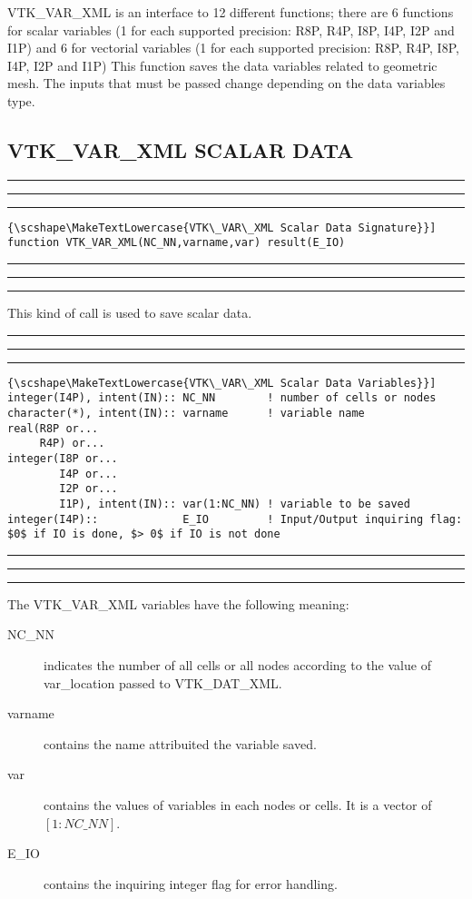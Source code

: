 \documentclass[pagesize=pdftex,fontsize=10pt,paper=a4,oneside]{scrbook}
\DeclareRobustCommand{\MarginNote}[1]{\marginpar{%
\slshape\footnotesize%
\parindent=0pt\lineskip=0pt\lineskiplimit=0pt%
\tolerance=2000\hyphenpenalty=300\exhyphenpenalty=300%
\doublehyphendemerits=100000\finalhyphendemerits=\doublehyphendemerits%
\raggedright\hspace{0pt}#1}}
\newenvironment{boxred}[1]%
               {%
                \noindent\hspace*{-0.025\textwidth}%
                \color{Maroon}%
                \rule[-5.8pt]{0.6pt}{6pt}\hspace*{-0.6pt}\rule{1.05\textwidth}{0.6pt}\hspace*{-0.6pt}\rule[-5.8pt]{0.6pt}{6pt}%
                \color{black}%
                \vspace*{0.6pt}\MarginNote{\color{Maroon}{#1}}%
               }%
               {%
                \noindent\hspace*{-0.025\textwidth}%
                \color{Maroon}%
                \rule[0pt]{0.6pt}{6pt}\hspace*{-0.6pt}\rule{1.05\textwidth}{0.6pt}\hspace*{-0.6pt}\rule[0pt]{0.6pt}{6pt}%
                \color{black}%
                \vspace*{2mm}%
               }
\DeclareRobustCommand{\MaiuscolettoBS}[1]{\textls[80]{\scshape\MakeTextLowercase{#1}}}
\begin{document}
VTK\_VAR\_XML is an interface to 12 different functions; there are 6 functions for scalar variables (1 for each supported
precision: R8P, R4P, I8P, I4P, I2P and I1P) and 6 for vectorial variables (1 for each supported precision: R8P, R4P, I8P,
I4P, I2P and I1P)
This function saves the data variables related to geometric mesh. The inputs that must be passed change depending on the
data variables type.

\subsection{VTK\_VAR\_XML SCALAR DATA}

\begin{boxred}{}
\begin{lstlisting}[style=signature,title=\color{Maroon}\MaiuscolettoBS{VTK\_VAR\_XML Scalar Data Signature}]
function VTK_VAR_XML(NC_NN,varname,var) result(E_IO)
\end{lstlisting}
\end{boxred}

This kind of call is used to save scalar data.

\begin{boxred}{}
\begin{lstlisting}[style=variables,title=\color{Maroon}\MaiuscolettoBS{VTK\_VAR\_XML Scalar Data Variables}]
integer(I4P), intent(IN):: NC_NN        ! number of cells or nodes
character(*), intent(IN):: varname      ! variable name
real(R8P or...
     R4P) or...
integer(I8P or...
        I4P or...
        I2P or...
        I1P), intent(IN):: var(1:NC_NN) ! variable to be saved
integer(I4P)::             E_IO         ! Input/Output inquiring flag: $0$ if IO is done, $> 0$ if IO is not done
\end{lstlisting}
\end{boxred}

The VTK\_VAR\_XML variables have the following meaning:

\begin{description}
 \item[{\color{RoyalBlue}NC\_NN}] indicates the number of all cells or all nodes according to the value of
                                  {\color{RoyalBlue}var\_location} passed to VTK\_DAT\_XML.
 \item[{\color{RoyalBlue}varname}] contains the name attribuited the variable saved.
 \item[{\color{RoyalBlue}var}] contains the values of variables in each nodes or cells. It is a vector of $[1:NC\_NN]$.
 \item[{\color{RoyalBlue}E\_IO}] contains the inquiring integer flag for error handling.
\end{description}
\end{document}
